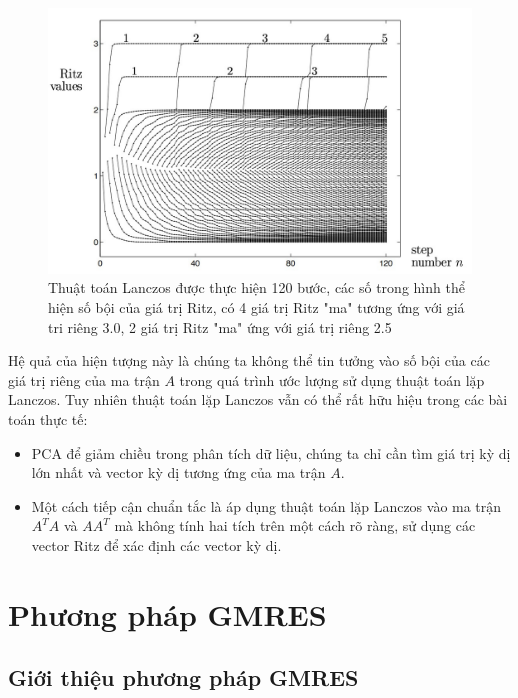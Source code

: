 \documentclass[14pt, a4paper]{article}
\numberwithin{equation}{section}
\numberwithin{algorithm}{section}
\numberwithin{figure}{section}
\numberwithin{dl}{section}
\numberwithin{md}{section}
\numberwithin{bd}{section}
\numberwithin{dn}{section}
\numberwithin{hq}{section}
\begin{document}
\begin{figure}[h!] \centering

    \includegraphics[scale=0.4]{Lanczos-Repeated-Eigenvalues.jpg}
    \caption{Thuật toán Lanczos được thực hiện 120 bước, các số trong hình thể hiện số bội của giá trị Ritz, có 4 giá trị Ritz "ma" tương ứng với giá tri riêng 3.0, 2 giá trị Ritz "ma" ứng với giá trị riêng 2.5 \cite{trefethen1997numerical}}

    \label{fig:Lanczos-Repeated-Eigenvalues}
\end{figure}

Hệ quả của hiện tượng này là chúng ta không thể tin tưởng vào số bội của các giá trị riêng của ma trận $A$ trong quá trình ước lượng sử dụng thuật toán lặp Lanczos.
Tuy nhiên thuật toán lặp Lanczos vẫn có thể rất hữu hiệu trong các bài toán thực tế:

\begin{itemize}
    \item PCA để giảm chiều trong phân tích dữ liệu, chúng ta chỉ cần tìm giá trị kỳ dị lớn nhất và vector kỳ dị tương ứng của ma trận $A$.
    \item Một cách tiếp cận chuẩn tắc là áp dụng thuật toán lặp Lanczos vào ma trận $A^T A$ và $A A^T$ mà không tính hai tích trên một cách rõ ràng, sử dụng các vector Ritz để xác định các vector kỳ dị.
\end{itemize}


\section{Phương pháp GMRES}

\subsection{Giới thiệu phương pháp GMRES} \label{GMRES-Introduction}
\end{document}
